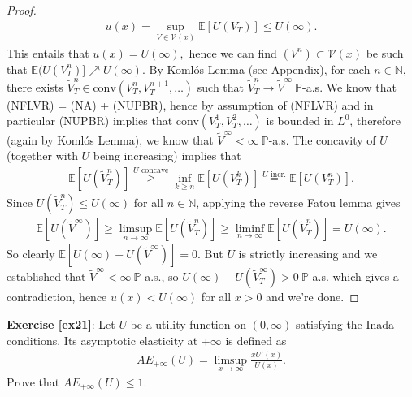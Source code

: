 \documentclass[12pt,a4paper, twoside]{article}
\theoremstyle{definition}
\newcommand{\EE}{\mathbb{E}} %
\newcommand{\PP}{\mathbb{P}} %
\begin{document}
\begin{proof}
\begin{align*}
u(x) = \sup_{V \in \mathcal{V}(x)} \EE[U(V_T)] \leq U( \infty).
\end{align*}
This entails that $u(x)= U( \infty),$ hence we can find $(V^n) \subset \mathcal{V}(x)$ be such that $\EE(U(V_T^n)] \nearrow U(\infty)$. By Komlós Lemma (see Appendix), for each $n \in \mathbb{N}$, there exists $\tilde{V}_T^n \in \text{conv}(V_T^n, V_T^{n+1}, \dots)$ such that $\tilde{V}_T^n \to \tilde{V}^\infty \ \PP$-a.s. We know that (NFLVR) = (NA) + (NUPBR), hence by assumption of (NFLVR) and in particular (NUPBR) implies that conv$(V_T^1, V_T^2, \dots)$ is bounded in $L^0$, therefore (again by Komlós Lemma), we know that $\tilde{V}^\infty < \infty \ \PP$-a.s. The concavity of $U$ (together with $U$ being increasing) implies that
\begin{align*}
\EE[U(\tilde{V}_T^n)] \overset{U \text{ concave}}\geq \inf_{k \geq n} \EE[U(V_T^k)] \overset{U \text{ incr.}}= \EE[U(V_T^n)]. 
\end{align*}
Since $U(\tilde{V}_T^n) \leq U( \infty)$ for all $n \in \mathbb{N}$, applying the reverse Fatou lemma gives
\begin{align*}
\EE[U(\tilde{V}^\infty)] \geq \limsup_{n \to \infty} \EE[U( \tilde{V}_T^n)] \geq \liminf_{n \to \infty} \EE[U(\tilde{V}_T^n)] = U( \infty). 
\end{align*}
So clearly $\EE[U( \infty)-U(\tilde{V}^\infty)]=0$. But $U$ is strictly increasing and we established that $\tilde{V}^\infty < \infty \ \PP$-a.s., so $U( \infty) - U( \tilde{V}_T^\infty) >0 \ \PP$-a.s. which gives  a contradiction, hence $u(x) < U( \infty)$ for all $x>0$ and we're done. 
\end{proof}
\newpage
\noindent \textbf{Exercise \ref{ex21}}: Let $U$ be a utility function on $(0, \infty)$ satisfying the Inada conditions. Its asymptotic elasticity at $+ \infty$ is defined as
\begin{align*}
AE_{+ \infty}(U) = \limsup_{x \to \infty} \frac{xU'(x)}{U(x)}.
\end{align*}
Prove that $AE_{+ \infty}(U) \leq 1$. 
\end{document}

